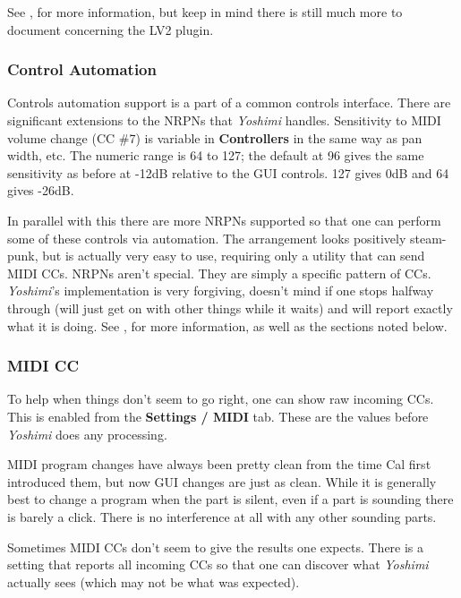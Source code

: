 \documentclass[
 11pt,
 twoside,
 a4paper,
 final                                 %
]{article}
\begin{document}
   See , for more information, but keep in
   mind there is still much more to document concerning the LV2 plugin.

\subsubsection{Control Automation}
\label{subsubsec:new_features_control_automation}

   Controls automation support is a part of a common
   controls interface.  There are significant extensions to the NRPNs that
   \textsl{Yoshimi} handles.
   Sensitivity to MIDI volume change (CC \#7) is variable in
   \textbf{Controllers} in the same way as pan width, etc. The numeric range is
   64 to 127; the default at 96 gives the same sensitivity as before at -12dB
   relative to the GUI controls.  127 gives 0dB and 64 gives -26dB.

   In parallel with this there are more NRPNs supported so that one can perform
   some of these controls via automation. The arrangement looks positively
   steam-punk, but is actually very easy to use, requiring only a utility that
   can send MIDI CCs.  NRPNs aren't special. They are simply a specific pattern
   of CCs.  \textsl{Yoshimi}'s implementation is very forgiving, doesn't mind
   if one stops halfway through (will just get on with other things while it
   waits) and will report exactly what it is doing.
   See , for more information, as well as the sections
   noted below.

\subsubsection{MIDI CC}
\label{subsubsec:new_features_midi_cc}

   To help when things don't seem to go right, one can show raw incoming
   CCs. This is enabled from the \textbf{Settings / MIDI} tab.
   These are the values before \textsl{Yoshimi} does any processing.

   MIDI program changes have always been pretty clean from the time Cal first
   introduced them, but now GUI changes are just as clean. While it is
   generally best to change a program when the part is silent, even if a part
   is sounding there is barely a click. There is no interference at all
   with any other sounding parts.

   Sometimes MIDI CCs don't seem to give the results one expects. There is
   a setting that reports all incoming CCs so that one can discover
   what \textsl{Yoshimi} actually sees (which may not be what was expected).
\end{document}
